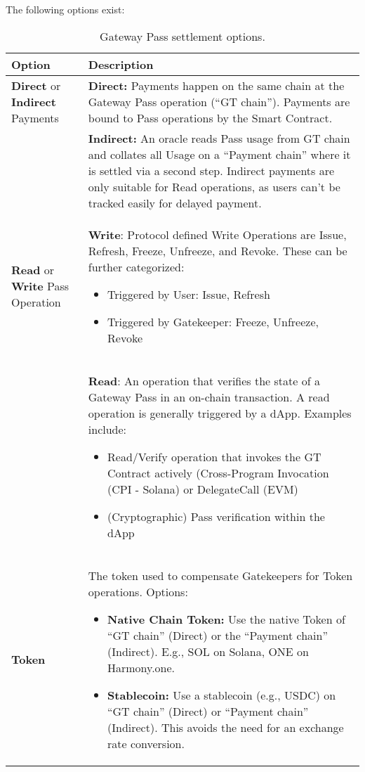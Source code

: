 The following options exist:

{ %
\renewcommand{\arraystretch}{1.5}
\begin{table}
\small
\centering
\begin{tabular}{|p{}|p{}|}
\hline
\textbf{Option} & \textbf{Description} \\
\hline
\textbf{Direct} or \textbf{Indirect} Payments & \textbf{Direct:} Payments happen on the same chain at the Gateway Pass operation (“GT chain”). Payments are bound to Pass operations by the Smart Contract.\\
& \textbf{Indirect:} An oracle reads Pass usage from GT chain and collates all Usage on a “Payment chain” where it is settled via a second step. Indirect payments are only suitable for Read operations, as users can’t be tracked easily for delayed payment.\\
\hline
\textbf{Read} or \textbf{Write} Pass Operation & \textbf{Write}: Protocol defined Write Operations are Issue, Refresh, Freeze, Unfreeze, and Revoke. These can be further categorized:
\begin{itemize}
\item Triggered by User: Issue, Refresh
\item Triggered by Gatekeeper: Freeze, Unfreeze, Revoke
\end{itemize}\\
& \textbf{Read}: An operation that verifies the state of a Gateway Pass in an on-chain transaction. A read operation is generally triggered by a dApp. Examples include:
\begin{itemize}
\item Read/Verify operation that invokes the GT Contract actively (Cross-Program Invocation (CPI - Solana) or DelegateCall (EVM)
\item (Cryptographic) Pass verification within the dApp
\end{itemize}\\
\hline
\textbf{Token} &The token used to compensate Gatekeepers for Token operations. Options:
\begin{itemize}
\item \textbf{Native Chain Token:} Use the native Token of “GT chain” (Direct) or the “Payment chain” (Indirect). E.g., SOL on Solana, ONE on Harmony.one.
\item \textbf{Stablecoin:} Use a stablecoin (e.g., USDC) on “GT chain” (Direct) or “Payment chain” (Indirect). This avoids the need for an exchange rate conversion.
\end{itemize}\\
\hline
\end{tabular}
\caption{\label{tbl:gt-settlement} Gateway Pass settlement options.}
\end{table}
}

